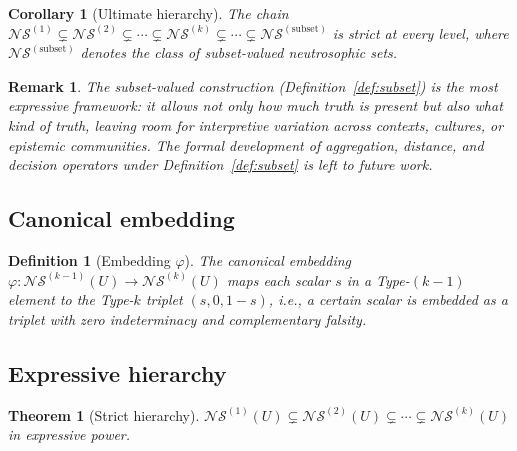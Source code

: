 \documentclass[10pt,a4paper]{article}
\newtheorem{definition}{Definition}
\newtheorem{theorem}{Theorem}
\newtheorem{corollary}{Corollary}
\newtheorem{remark}{Remark}
\begin{document}
\begin{corollary}[Ultimate hierarchy]
\label{cor:ultimate}
The chain
$\mathcal{NS}^{(1)} \subsetneq \mathcal{NS}^{(2)} \subsetneq
\cdots \subsetneq \mathcal{NS}^{(k)} \subsetneq \cdots
\subsetneq \mathcal{NS}^{(\mathrm{subset})}$
is strict at every level, where $\mathcal{NS}^{(\mathrm{subset})}$
denotes the class of subset-valued neutrosophic sets.
\end{corollary}

\begin{remark}
The subset-valued construction (Definition~\ref{def:subset})
is the most expressive framework: it allows not only
\emph{how much} truth is present but also \emph{what kind}
of truth, leaving room for interpretive variation across
contexts, cultures, or epistemic communities.
The formal development of aggregation, distance, and
decision operators under Definition~\ref{def:subset}
is left to future work.
\end{remark}

\subsection{Canonical embedding}

\begin{definition}[Embedding $\varphi$]
The canonical embedding $\varphi: \mathcal{NS}^{(k-1)}(U)
\to \mathcal{NS}^{(k)}(U)$ maps each scalar $s$ in a
Type-$(k-1)$ element to the Type-$k$ triplet
$(s, 0, 1-s)$, i.e., a certain scalar is embedded as a
triplet with zero indeterminacy and complementary falsity.
\end{definition}

\subsection{Expressive hierarchy}

\begin{theorem}[Strict hierarchy]
\label{thm:hierarchy}
$\mathcal{NS}^{(1)}(U) \subsetneq \mathcal{NS}^{(2)}(U)
\subsetneq \cdots \subsetneq \mathcal{NS}^{(k)}(U)$
in expressive power.
\end{theorem}
\end{document}
